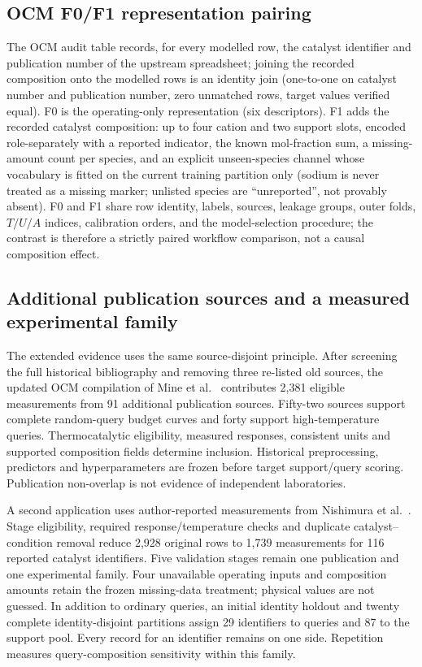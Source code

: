 \documentclass[11pt,a4paper]{article}
\begin{document}
\subsection{OCM F0/F1 representation pairing}
The OCM audit table records, for every modelled row, the catalyst identifier and
publication number of the upstream spreadsheet; joining the recorded composition onto
the modelled rows is an identity join (one-to-one on catalyst number and publication
number, zero unmatched rows, target values verified equal). F0 is the operating-only
representation (six descriptors). F1 adds the recorded catalyst composition: up to four
cation and two support slots, encoded role-separately with a reported indicator, the
known mol-fraction sum, a missing-amount count per species, and an explicit
unseen-species channel whose vocabulary is fitted on the current training partition only
(sodium is never treated as a missing marker; unlisted species are ``unreported'', not
provably absent). F0 and F1 share row identity, labels, sources, leakage groups, outer
folds, $T/U/A$ indices, calibration orders, and the model-selection procedure; the
contrast is therefore a strictly paired workflow comparison, not a causal composition
effect.


\subsection{Additional publication sources and a measured experimental family}
The extended evidence uses the same source-disjoint principle. After screening the full historical bibliography and removing three re-listed old sources,
the updated OCM compilation of Mine et al.\ \cite{mine} contributes 2,381 eligible measurements from 91 additional publication sources.
Fifty-two sources support complete random-query budget curves and forty support high-temperature queries.
Thermocatalytic eligibility, measured responses, consistent units and supported composition fields determine inclusion.
Historical preprocessing, predictors and hyperparameters are frozen before target support/query scoring.
Publication non-overlap is not evidence of independent laboratories.

A second application uses author-reported measurements from Nishimura et al.\ \cite{nishimura2023new}.
Stage eligibility, required response/temperature checks and duplicate catalyst--condition removal reduce 2,928 original rows to 1,739 measurements for 116 reported catalyst identifiers.
Five validation stages remain one publication and one experimental family. Four unavailable operating inputs and composition amounts retain the frozen missing-data treatment; physical values are not guessed.
In addition to ordinary queries, an initial identity holdout and twenty complete identity-disjoint partitions assign 29 identifiers to queries and 87 to the support pool.
Every record for an identifier remains on one side. Repetition measures query-composition sensitivity within this family.
\end{document}
